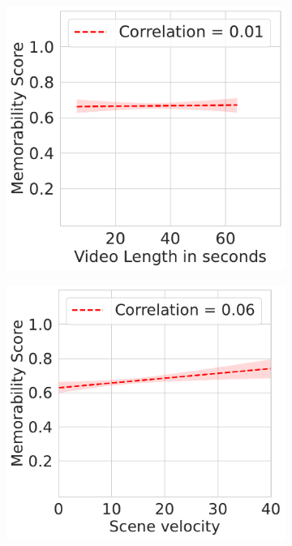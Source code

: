 \begin{landscape}
\begin{figure}[]
\begin{subfigure}{0.3\textwidth}
        \caption{}
        \label{subfig:emotion vs recall}
    \end{subfigure}
    \begin{subfigure}{0.3\textwidth}
        \centering
        \includegraphics[width=\textwidth]{images/length_vs_mem.pdf}
        \caption{}
        \label{subfig:length vs mem}
    \end{subfigure}
    \begin{subfigure}{0.3\textwidth}
        \centering
        \includegraphics[width=\textwidth]{images/velocity_vs_recall.pdf}

\end{subfigure}
\end{figure}
\end{landscape}
